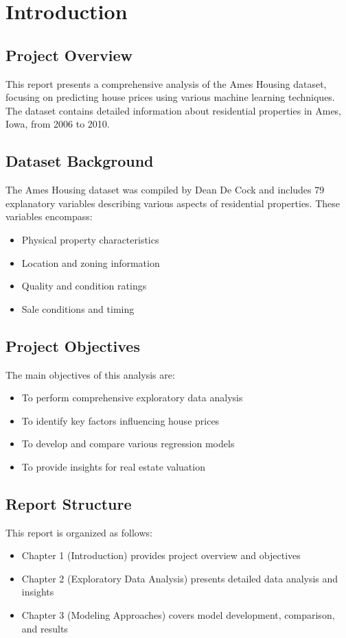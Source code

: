 \chapter{Introduction}

\section{Project Overview}
This report presents a comprehensive analysis of the Ames Housing dataset, focusing on predicting house prices using various machine learning techniques. The dataset contains detailed information about residential properties in Ames, Iowa, from 2006 to 2010.

\section{Dataset Background}
The Ames Housing dataset was compiled by Dean De Cock and includes 79 explanatory variables describing various aspects of residential properties. These variables encompass:
\begin{itemize}
    \item Physical property characteristics
    \item Location and zoning information
    \item Quality and condition ratings
    \item Sale conditions and timing
\end{itemize}

\section{Project Objectives}
The main objectives of this analysis are:
\begin{itemize}
    \item To perform comprehensive exploratory data analysis
    \item To identify key factors influencing house prices
    \item To develop and compare various regression models
    \item To provide insights for real estate valuation
\end{itemize}

\section{Report Structure}
This report is organized as follows:
\begin{itemize}
    \item Chapter 1 (Introduction) provides project overview and objectives
    \item Chapter 2 (Exploratory Data Analysis) presents detailed data analysis and insights
    \item Chapter 3 (Modeling Approaches) covers model development, comparison, and results
\end{itemize} 